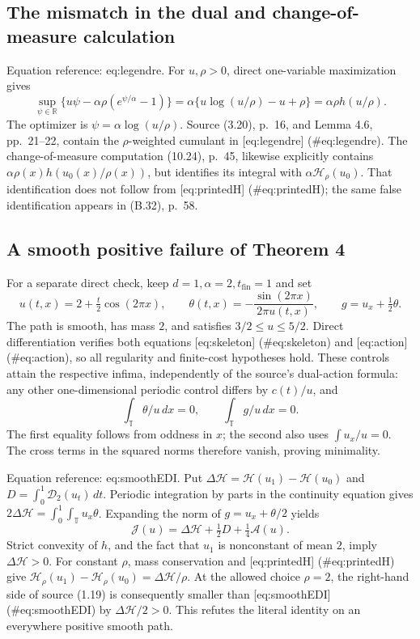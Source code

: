 \documentclass[10pt]{article}
\begin{document}
\subsection*{The mismatch in the dual and change-of-measure calculation}
Equation reference: eq:legendre. For \(u,\rho>0\), direct one-variable maximization gives \[
\sup_{\psi\in\mathbb R}\{u\psi-\alpha\rho(e^{\psi/\alpha}-1)\}
 =\alpha\{u\log(u/\rho)-u+\rho\}
 =\alpha\rho h(u/\rho).\] The optimizer is \(\psi=\alpha\log(u/\rho)\). Source (3.20), p. 16, and Lemma 4.6, pp. 21–22, contain the \(\rho\)-weighted cumulant in [eq:legendre] (\#eq:legendre). The change-of-measure computation (10.24), p. 45, likewise explicitly contains \(\alpha\rho(x)h(u_0(x)/\rho(x))\), but identifies its integral with \(\alpha\mathcal H_\rho(u_0)\). That identification does not follow from [eq:printedH] (\#eq:printedH); the same false identification appears in (B.32), p. 58.\par
\subsection*{A smooth positive failure of Theorem 4}
For a separate direct check, keep \(d=1,\alpha=2,t_{\mathrm{fin}}=1\) and set \[u(t,x)=2+\tfrac t2\cos(2\pi x),\qquad
\theta(t,x)=-\frac{\sin(2\pi x)}{2\pi u(t,x)},\qquad
g=u_x+\tfrac12\theta.\] The path is smooth, has mass \(2\), and satisfies \(3/2\le u\le5/2\). Direct differentiation verifies both equations [eq:skeleton] (\#eq:skeleton) and [eq:action] (\#eq:action), so all regularity and finite-cost hypotheses hold. These controls attain the respective infima, independently of the source’s dual-action formula: any other one-dimensional periodic control differs by \(c(t)/u\), and \[\int_{\mathbb T}\theta/u\,dx=0,\qquad
\int_{\mathbb T}g/u\,dx=0.\] The first equality follows from oddness in \(x\); the second also uses \(\int u_x/u=0\). The cross terms in the squared norms therefore vanish, proving minimality.\par
Equation reference: eq:smoothEDI. Put \(\Delta\mathcal H=\mathcal H(u_1)-\mathcal H(u_0)\) and \(D=\int_0^1\mathcal D_2(u_t)\,dt\). Periodic integration by parts in the continuity equation gives \(2\Delta\mathcal H=\int_0^1\int_{\mathbb T}u_x\theta\). Expanding the norm of \(g=u_x+\theta/2\) yields \[
\mathcal J(u)=\Delta\mathcal H+\tfrac12D+\tfrac14\mathcal A(u).\] Strict convexity of \(h\), and the fact that \(u_1\) is nonconstant of mean \(2\), imply \(\Delta\mathcal H>0\). For constant \(\rho\), mass conservation and [eq:printedH] (\#eq:printedH) give \(\mathcal H_\rho(u_1)-\mathcal H_\rho(u_0)=\Delta\mathcal H/\rho\). At the allowed choice \(\rho=2\), the right-hand side of source (1.19) is consequently smaller than [eq:smoothEDI] (\#eq:smoothEDI) by \(\Delta\mathcal H/2>0\). This refutes the literal identity on an everywhere positive smooth path.\par
\end{document}
